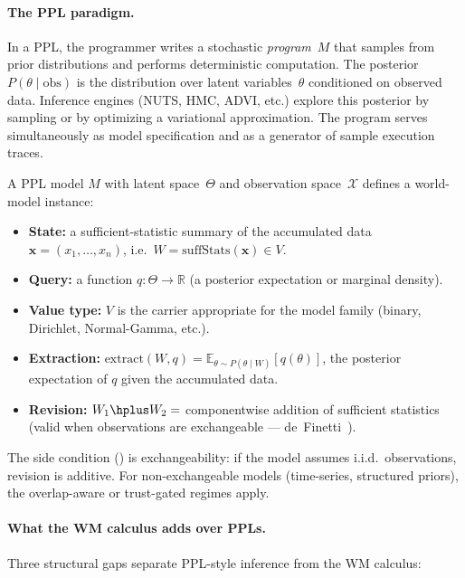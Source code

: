 \paragraph{The PPL paradigm.}
In a PPL, the programmer writes a stochastic \emph{program}~$M$ that
samples from prior distributions and performs deterministic computation.
The posterior $P(\theta \mid \mathrm{obs})$ is the distribution over
latent variables~$\theta$ conditioned on observed data.  Inference
engines (NUTS, HMC, ADVI, etc.) explore this posterior by sampling or
by optimizing a variational approximation.  The program serves
simultaneously as model specification and as a generator of sample
execution traces.

\begin{definition}
\label{def:ppl-wm}
A PPL model $M$ with latent space~$\Theta$ and observation
space~$\mathcal{X}$ defines a world-model instance:
\begin{itemize}
\item \textbf{State:} a sufficient-statistic summary of the
  accumulated data $\mathbf{x} = (x_1, \ldots, x_n)$, i.e.\
  $W = \mathrm{suffStats}(\mathbf{x}) \in V$.
\item \textbf{Query:} a function $q : \Theta \to \mathbb{R}$ (a
  posterior expectation or marginal density).
\item \textbf{Value type:} $V$ is the carrier appropriate for the
  model family (binary, Dirichlet, Normal-Gamma, etc.).
\item \textbf{Extraction:} $\mathrm{extract}(W, q) =
  \mathbb{E}_{\theta \sim P(\theta \mid W)}[q(\theta)]$, the
  posterior expectation of $q$ given the accumulated data.
\item \textbf{Revision:} $W_1 \hplus W_2 = $ componentwise addition
  of sufficient statistics (valid when observations are
  exchangeable --- de~Finetti~\cite{deFinetti1974}).
\end{itemize}
The side condition (\claimConditional{}) is exchangeability: if the
model assumes i.i.d.\ observations, revision is additive.  For
non-exchangeable models (time-series, structured priors), the overlap-aware
or trust-gated regimes apply.
\end{definition}

\paragraph{What the WM calculus adds over PPLs.}
Three structural gaps separate PPL-style inference from the WM calculus:

